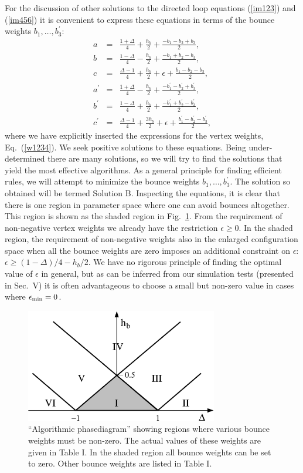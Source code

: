 \documentclass[10pt,pre,aps,twocolumn,showpacs,superscriptaddress,
floatfix]{revtex4}
\newcommand{\bea}{\begin{eqnarray}}
\newcommand{\eea}{\end{eqnarray}}
\newcommand{\f}{\frac}
\begin{document}
For the discussion of other solutions to the directed loop equations 
(\ref{im123}) and (\ref{im456}) it is convenient to express these equations
in terms of the bounce weights $b_1,\ldots,b^\prime_3$:
\bea
a & = & \f{1+\Delta}{4} + \f{h_b}{2} + \f{-b_1-b_2+b_3}{2}, \nonumber\\
b & = & \f{1-\Delta}{4} - \f{h_b}{2} + \f{-b_1+b_2-b_3}{2}, \nonumber \\
c & = & \f{\Delta-1}{4} + \f{h_b}{2} + \epsilon + \f{b_1-b_2-b_3}{2}, 
\label{dim123456} \\
a^\prime & = & \f{1+\Delta}{4} - \f{h_b}{2} + 
\f{-b^\prime_1-b^\prime_2+b^\prime_3}{2}, \nonumber \\
b^\prime & = & \f{1-\Delta}{4} + \f{h_b}{2} + 
\f{-b^\prime_1+b^\prime_2-b^\prime_3}{2}, \nonumber \\
	c^\prime & = & \f{\Delta-1}{4} + \f{3h_b}{2} + 
\epsilon+ \f{b^\prime_1-b^\prime_2-b^\prime_3}{2}, \nonumber
\eea
where we have explicitly inserted the expressions for the vertex weights, 
Eq.~(\ref{w1234}). We seek positive solutions to these equations. Being 
under-determined there are many solutions, so we will try to find the 
solutions that yield the most effective algorithms. As a general principle 
for finding efficient rules, we will attempt to minimize the bounce weights 
$b_1,\ldots,b^\prime_3$.
The solution so obtained will be termed Solution B. Inspecting the equations, 
it is clear that there is one region in parameter space where one can avoid 
bounces altogether. This region is shown as the shaded region in 
Fig.~\ref{phasediagram}. From the requirement of non-negative vertex weights 
we already have the restriction $\epsilon \geq 0$. In the shaded region, the 
requirement of non-negative weights also in the enlarged configuration 
space when all the bounce weights are zero imposes an additional constraint
on $\epsilon$: $\epsilon \geq (1-\Delta)/4 -h_b/2$. We have no rigorous
principle of finding the optimal value of $\epsilon$ in general, but as can 
be inferred from our simulation tests (presented in Sec.~V) it is often 
advantageous to choose a small but non-zero value in
cases where $\epsilon_{\rm min}=0$. 

\begin{figure}
\includegraphics[clip,width=8.4cm]{fig9.eps}
\caption{``Algorithmic phasediagram'' showing regions where various bounce 
weights must be non-zero. The actual values of these weights are given in
Table I. In the shaded region all bounce weights can be set to zero. Other
bounce weights are listed in Table I. 
\label{phasediagram}}
\end{figure}
\end{document}
